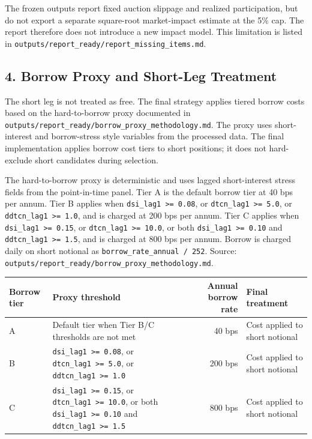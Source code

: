 \documentclass[
]{article}
\begin{document}
The frozen outputs report fixed auction slippage and realized
participation, but do not export a separate square-root market-impact
estimate at the 5\% cap. The report therefore does not introduce a new
impact model. This limitation is listed in
\texttt{outputs/report\_ready/report\_missing\_items.md}.

\hypertarget{4-borrow-proxy-and-short-leg-treatment}{%
\subsection{4. Borrow Proxy and Short-Leg
Treatment}\label{4-borrow-proxy-and-short-leg-treatment}}

The short leg is not treated as free. The final strategy applies tiered
borrow costs based on the hard-to-borrow proxy documented in
\texttt{outputs/report\_ready/borrow\_proxy\_methodology.md}. The proxy
uses short-interest and borrow-stress style variables from the processed
data. The final implementation applies borrow cost tiers to short
positions; it does not hard-exclude short candidates during selection.

The hard-to-borrow proxy is deterministic and uses lagged short-interest
stress fields from the point-in-time panel. Tier A is the default borrow
tier at 40 bps per annum. Tier B applies when
\texttt{dsi\_lag1\ \textgreater{}=\ 0.08}, or
\texttt{dtcn\_lag1\ \textgreater{}=\ 5.0}, or
\texttt{ddtcn\_lag1\ \textgreater{}=\ 1.0}, and is charged at 200 bps
per annum. Tier C applies when
\texttt{dsi\_lag1\ \textgreater{}=\ 0.15}, or
\texttt{dtcn\_lag1\ \textgreater{}=\ 10.0}, or both
\texttt{dsi\_lag1\ \textgreater{}=\ 0.10} and
\texttt{ddtcn\_lag1\ \textgreater{}=\ 1.5}, and is charged at 800 bps
per annum. Borrow is charged daily on short notional as
\texttt{borrow\_rate\_annual\ /\ 252}. Source:
\texttt{outputs/report\_ready/borrow\_proxy\_methodology.md}.

\begin{longtable}[]{@{}llrl@{}}
\toprule
Borrow tier & Proxy threshold & Annual borrow rate & Final treatment \\
\midrule
\endhead
A & Default tier when Tier B/C thresholds are not met & 40 bps & Cost
applied to short notional \\
B & \texttt{dsi\_lag1\ \textgreater{}=\ 0.08}, or
\texttt{dtcn\_lag1\ \textgreater{}=\ 5.0}, or
\texttt{ddtcn\_lag1\ \textgreater{}=\ 1.0} & 200 bps & Cost applied to
short notional \\
C & \texttt{dsi\_lag1\ \textgreater{}=\ 0.15}, or
\texttt{dtcn\_lag1\ \textgreater{}=\ 10.0}, or both
\texttt{dsi\_lag1\ \textgreater{}=\ 0.10} and
\texttt{ddtcn\_lag1\ \textgreater{}=\ 1.5} & 800 bps & Cost applied to
short notional \\
\bottomrule
\end{longtable}
\end{document}

